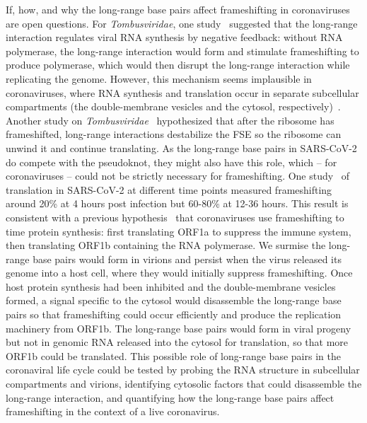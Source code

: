 \documentclass[main.tex]{subfiles}
\begin{document}
If, how, and why the long-range base pairs affect frameshifting in coronaviruses are open questions.
For \textit{Tombusviridae}, one study~\cite{Barry2002} suggested that the long-range interaction regulates viral RNA synthesis by negative feedback: without RNA polymerase, the long-range interaction would form and stimulate frameshifting to produce polymerase, which would then disrupt the long-range interaction while replicating the genome.
However, this mechanism seems implausible in coronaviruses, where RNA synthesis and translation occur in separate subcellular compartments (the double-membrane vesicles and the cytosol, respectively)~\cite{Wolff2020}.
Another study on \textit{Tombusviridae}~\cite{Mikkelsen2023} hypothesized that after the ribosome has frameshifted, long-range interactions destabilize the FSE so the ribosome can unwind it and continue translating.
As the long-range base pairs in SARS-CoV-2 do compete with the pseudoknot, they might also have this role, which -- for coronaviruses -- could not be strictly necessary for frameshifting.
One study~\cite{Kim2021} of translation in SARS-CoV-2 at different time points measured frameshifting around 20\% at 4 hours post infection but 60-80\% at 12-36 hours.
This result is consistent with a previous hypothesis~\cite{Kelly2021} that coronaviruses use frameshifting to time protein synthesis: first translating ORF1a to suppress the immune system, then translating ORF1b containing the RNA polymerase.
We surmise the long-range base pairs would form in virions and persist when the virus released its genome into a host cell, where they would initially suppress frameshifting.
Once host protein synthesis had been inhibited and the double-membrane vesicles formed, a signal specific to the cytosol would disassemble the long-range base pairs so that frameshifting could occur efficiently and produce the replication machinery from ORF1b.
The long-range base pairs would form in viral progeny but not in genomic RNA released into the cytosol for translation, so that more ORF1b could be translated.
This possible role of long-range base pairs in the coronaviral life cycle could be tested by probing the RNA structure in subcellular compartments and virions, identifying cytosolic factors that could disassemble the long-range interaction, and quantifying how the long-range base pairs affect frameshifting in the context of a live coronavirus.
\end{document}
